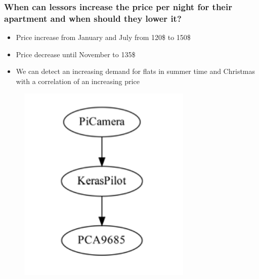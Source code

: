\documentclass{beamer}
\begin{document}
\begin{frame}
\frametitle{When can lessors increase the price per night for their apartment and when should they lower it?}
\begin{itemize}
\item Price increase from January and July from 120\$ to 150\$
\item Price decrease until November to 135\$
\item We can detect an increasing demand for flats in summer time and Christmas with a correlation of an increasing price
\end{itemize}
\begin{figure}
\includegraphics[width=0.8\linewidth]{photo/autonom}
\end{figure}
\end{frame}
\end{document}
